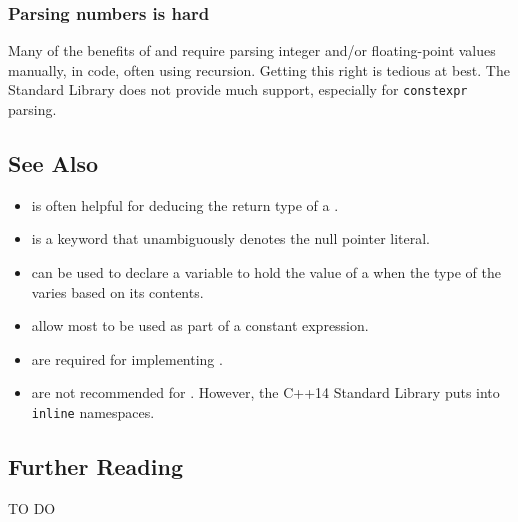 \subsubsection[Parsing numbers is hard]{Parsing numbers is hard}\label{parsing-numbers-is-hard}

Many of the benefits of  and  require parsing integer and/or floating-point values
manually, in code, often using recursion. Getting this right is tedious
at best. The Standard Library does not provide much support, especially
for \lstinline!constexpr! parsing.



\subsection[See Also]{See Also}\label{see-also}

\begin{itemize}
\item{is often helpful for deducing the return type of a .}
\item{is a keyword that unambiguously denotes the null pointer literal.}
\item{ can be used to declare a variable to hold the value of a  when the type of the  varies based on its contents.}
\item{allow most  to be used as part of a constant expression.}
\item{are required for implementing .}
\item{are not recommended for . However, the C++14 Standard Library puts  into \lstinline!inline! namespaces.}
\end{itemize}

\subsection[Further Reading]{Further Reading}\label{further-reading}

TO DO
